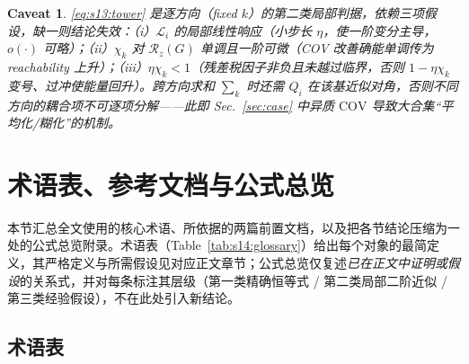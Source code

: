 \documentclass[11pt,a4paper]{article}
\newtheorem{caveat}[theorem]{Caveat}
\newcommand{\cL}{\mathcal{L}}   %
\newcommand{\Rstr}{\mathcal{R}}     %
\newcommand{\COV}{\mathrm{COV}}     %
\begin{document}
\begin{caveat}\label{cav:s13:tower}
\eqref{eq:s13:tower} 是\emph{逐方向}（fixed $k$）的第二类局部判据，依赖三项假设，缺一则结论失效：（i）$\cL_i$ 的局部线性响应（小步长 $\eta$，使一阶变分主导，$o(\cdot)$ 可略）；（ii）$\chi_k$ 对 $\Rstr_z(G)$ 单调且一阶可微（COV 改善确能单调传为 reachability 上升）；（iii）$\eta\chi_k<1$（残差税因子非负且未越过临界，否则 $1-\eta\chi_k$ 变号、过冲使能量回升）。跨方向求和 $\sum_k$ 时还需 $Q_i$ 在该基近似对角，否则不同方向的耦合项不可逐项分解——此即 Sec.~\ref{sec:case} 中异质 $\COV$ 导致大合集“平均化/糊化”的机制。
\end{caveat}

\section{术语表、参考文档与公式总览}\label{sec:glossary}

本节汇总全文使用的核心术语、所依据的两篇前置文档，以及把各节结论压缩为一处的公式总览附录。术语表（Table~\ref{tab:s14:glossary}）给出每个对象的最简定义，其严格定义与所需假设见对应正文章节；公式总览仅复述\emph{已在正文中证明或假设}的关系式，并对每条标注其层级（第一类精确恒等式 / 第二类局部二阶近似 / 第三类经验假设），不在此处引入新结论。

\subsection{术语表}\label{s14:terms}
\end{document}
